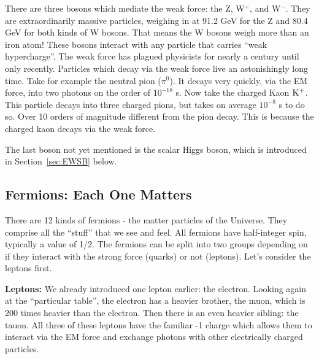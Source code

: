 There are three bosons which mediate the weak force: the Z, W$^+$, and W$^-$.
They are extraordinarily massive particles, weighing in at 91.2 GeV for the Z and 80.4 GeV for both kinds of W bosons. 
That means the W bosons weigh more than an iron atom! These bosons interact with any particle that carries ``weak hypercharge''.
The weak force has plagued physicists for nearly a century until only recently.
Particles which decay via the weak force live an astonishingly long time. 
Take for example the neutral pion ($\pi^0$). 
It decays very quickly, via the EM force, into two photons on the order of $10^{-18}$ s.
Now take the charged Kaon ${\rm K^+}$. 
This particle decays into three charged pions, but takes on average $10^{-8}$ s to do so.
Over 10 orders of magnitude different from the pion decay.
This is because the charged kaon decays via the weak force.

The last boson not yet mentioned is the scalar Higgs boson, which is introduced in Section~\ref{sec:EWSB} below.


\subsection{Fermions: Each One Matters}
There are 12 kinds of fermions - the matter particles of the Universe. 
They comprise all the ``stuff'' that we see and feel.
All fermions have half-integer spin, typically a value of 1/2. 
The fermions can be split into two groups depending on if they interact with the strong force (quarks) or not (leptons).
Let's consider the leptons first.

{\bf Leptons:}
We already introduced one lepton earlier: the electron. 
Looking again at the ``particular table'', the electron has a heavier brother, the muon, which is 200 times heavier than the electron. 
Then there is an even heavier sibling: the tauon. 
All three of these leptons have the familiar -1 charge which allows them to interact via the EM force and exchange photons with other electrically charged particles.

